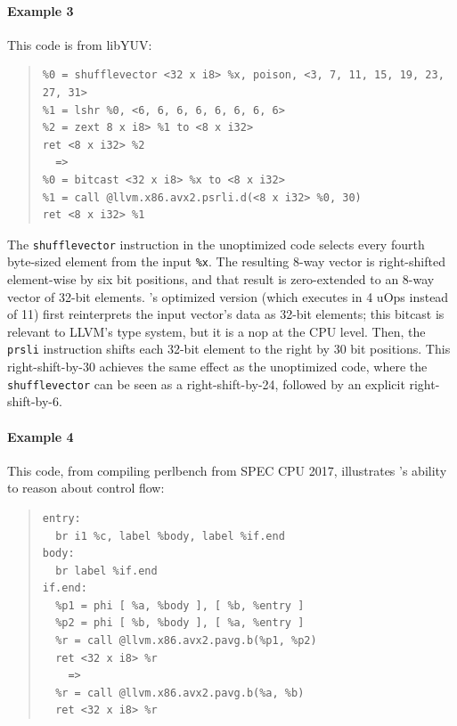 \paragraph*{Example 3}

This code is from libYUV:

{\begin{quote}\begin{verbatim}
%0 = shufflevector <32 x i8> %x, poison, <3, 7, 11, 15, 19, 23, 27, 31>
%1 = lshr %0, <6, 6, 6, 6, 6, 6, 6, 6>
%2 = zext 8 x i8> %1 to <8 x i32>
ret <8 x i32> %2
  =>
%0 = bitcast <32 x i8> %x to <8 x i32>
%1 = call @llvm.x86.avx2.psrli.d(<8 x i32> %0, 30)
ret <8 x i32> %1
\end{verbatim}
\end{quote}}

The \texttt{shufflevector} instruction in the unoptimized code selects
every fourth byte-sized element from the input \texttt{\%x}.
%
The resulting 8-way vector is right-shifted element-wise by six bit
positions, and that result is zero-extended to an 8-way vector of
32-bit elements.
%
\minotaur's optimized version (which executes in 4 uOps instead of 11)
first reinterprets the input vector's data as 32-bit elements; this
bitcast is relevant to LLVM's type system, but it is a nop at the CPU
level.
%
Then, the \texttt{prsli} instruction shifts each 32-bit element to the
right by 30 bit positions.
%
This right-shift-by-30 achieves the same effect as the unoptimized
code, where the \texttt{shufflevector} can be seen as a
right-shift-by-24, followed by an explicit right-shift-by-6.

\paragraph*{Example 4}

This code, from compiling perlbench from SPEC CPU 2017, illustrates
\minotaur's ability to reason about control flow:

{\begin{quote}\begin{verbatim}
entry:
  br i1 %c, label %body, label %if.end
body:
  br label %if.end
if.end:
  %p1 = phi [ %a, %body ], [ %b, %entry ]
  %p2 = phi [ %b, %body ], [ %a, %entry ]
  %r = call @llvm.x86.avx2.pavg.b(%p1, %p2)
  ret <32 x i8> %r
    =>
  %r = call @llvm.x86.avx2.pavg.b(%a, %b)
  ret <32 x i8> %r
\end{verbatim}
\end{quote}}

